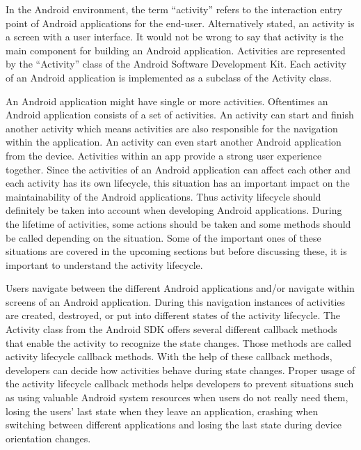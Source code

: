 In the Android environment, the term “activity” refers to the interaction entry point of Android applications for the end-user. Alternatively stated, an activity is a screen with a user interface. It would not be wrong to say that activity is the main component for building an Android application. Activities are represented by the “Activity” class of the Android Software Development Kit. Each activity of an Android application is implemented as a subclass of the Activity class. 

An Android application might have single or more activities. Oftentimes an Android application consists of a set of activities. An activity can start and finish another activity which means activities are also responsible for the navigation within the application. An activity can even start another Android application from the device. Activities within an app provide a strong user experience together. Since the activities of an Android application can affect each other and each activity has its own lifecycle, this situation has an important impact on the maintainability of the Android applications. Thus activity lifecycle should definitely be taken into account when developing Android applications. During the lifetime of activities, some actions should be taken and some methods should be called depending on the situation. Some of the important ones of these situations are covered in the upcoming sections but before discussing these, it is important to understand the activity lifecycle.

Users navigate between the different Android applications and/or navigate within screens of an Android application. During this navigation instances of activities are created, destroyed, or put into different states of the activity lifecycle. The Activity class from the Android SDK offers several different callback methods that enable the activity to recognize the state changes. Those methods are called activity lifecycle callback methods. With the help of these callback methods, developers can decide how activities behave during state changes. Proper usage of the activity lifecycle callback methods helps developers to prevent situations such as using valuable Android system resources when users do not really need them, losing the users' last state when they leave an application, crashing when switching between different applications and losing the last state during device orientation changes. 

